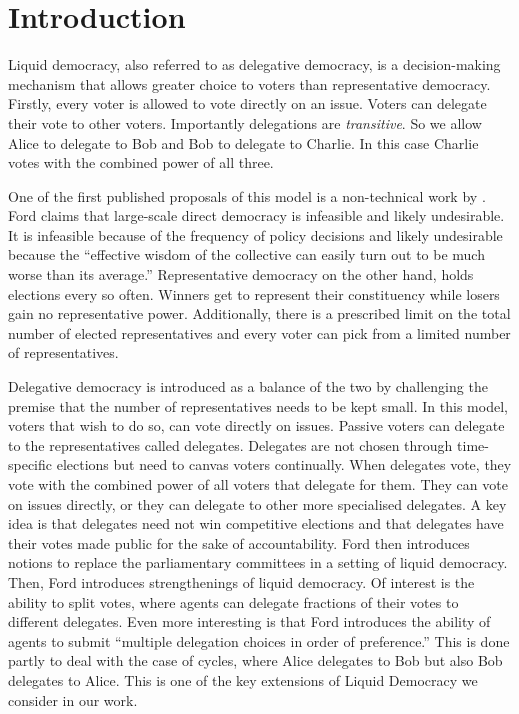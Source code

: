 \documentclass[11pt,a4paper, titlepage]{article}
\theoremstyle{definition}
\begin{document}
\newpage

\tableofcontents

\newpage

\section{Introduction}

Liquid democracy, also referred to as delegative democracy, is a decision-making mechanism that allows greater choice to voters than representative democracy.
Firstly, every voter is allowed to vote directly on an issue. 
Voters can delegate their vote to other voters.
Importantly delegations are \emph{transitive}. 
So we allow Alice to delegate to Bob and Bob to delegate to Charlie. In this case Charlie votes with the combined power of all three.

One of the first published proposals of this model is a non-technical work by \cite{ford2002delegative}. 
Ford claims that large-scale direct democracy is infeasible and likely undesirable.
It is infeasible because of the frequency of policy decisions and likely undesirable because the ``effective wisdom of the collective can easily turn out to be much worse than its average.''
Representative democracy on the other hand, holds elections every so often. Winners get to represent their constituency while losers gain no representative power.
Additionally, there is a prescribed limit on the total number of elected representatives and every voter can pick from a limited number of representatives.

Delegative democracy is introduced as a balance of the two by challenging the premise that the number of representatives needs to be kept small.
In this model, voters that wish to do so, can vote directly on issues.
Passive voters can delegate to the representatives called delegates.
Delegates are not chosen through time-specific elections but need to canvas voters continually.
When delegates vote, they vote with the combined power of all voters that delegate for them.
They can vote on issues directly, or they can delegate to other more specialised delegates.
A key idea is that delegates need not win competitive elections and that delegates have their votes made public for the sake of accountability. 
Ford then introduces notions to replace the parliamentary committees in a setting of liquid democracy.
Then, Ford introduces strengthenings of liquid democracy.
Of interest is the ability to split votes, where agents can delegate fractions of their votes to different delegates. 
Even more interesting is that Ford introduces the ability of agents to submit ``multiple delegation choices in order of preference.'' This is done partly to deal with the case of cycles, where Alice delegates to Bob but also Bob delegates to Alice.
This is one of the key extensions of Liquid Democracy we consider in our work.
\end{document}
